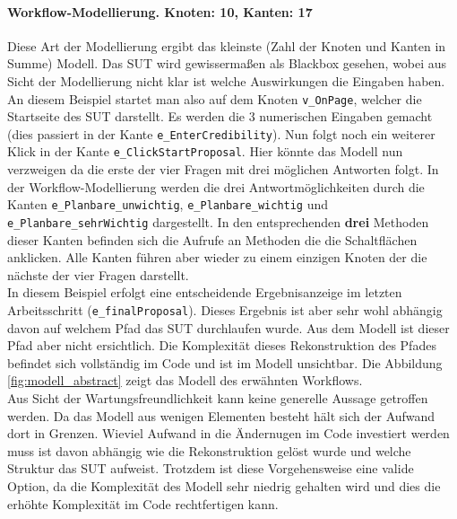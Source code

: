 \paragraph{Workflow-Modellierung. Knoten: 10, Kanten: 17}
Diese Art der Modellierung ergibt das kleinste (Zahl der Knoten und Kanten in Summe) Modell. Das SUT wird gewissermaßen als Blackbox gesehen, wobei aus Sicht der Modellierung nicht klar ist welche Auswirkungen die Eingaben haben. An diesem Beispiel startet man also auf dem Knoten \texttt{v\_OnPage}, welcher die Startseite des SUT darstellt. Es werden die 3 numerischen Eingaben gemacht (dies passiert in der Kante \texttt{e\_EnterCredibility}). Nun folgt noch ein weiterer Klick in der Kante \texttt{e\_ClickStartProposal}. Hier könnte das Modell nun verzweigen da die erste der vier Fragen mit drei möglichen Antworten folgt. In der Workflow-Modellierung werden die drei Antwortmöglichkeiten durch die Kanten \texttt{e\_Planbare\_unwichtig}, \texttt{e\_Planbare\_wichtig} und \texttt{e\_Planbare\_sehrWichtig} dargestellt. In den entsprechenden \textbf{drei} Methoden dieser Kanten befinden sich die Aufrufe an Methoden die die Schaltflächen anklicken. Alle Kanten führen aber wieder zu einem einzigen Knoten der die nächste der vier Fragen darstellt.\\
In diesem Beispiel erfolgt eine entscheidende Ergebnisanzeige im letzten Arbeitsschritt (\texttt{e\_finalProposal}). Dieses Ergebnis ist aber sehr wohl abhängig davon auf welchem Pfad das SUT durchlaufen wurde. Aus dem Modell ist dieser Pfad aber nicht ersichtlich. Die Komplexität dieses Rekonstruktion des Pfades befindet sich vollständig im Code und ist im Modell unsichtbar. Die Abbildung \ref{fig:modell_abstract} zeigt das Modell des erwähnten Workflows.\\
Aus Sicht der Wartungsfreundlichkeit kann keine generelle Aussage getroffen werden. Da das Modell aus wenigen Elementen besteht hält sich der Aufwand dort in Grenzen. Wieviel Aufwand in die Ändernugen im Code investiert werden muss ist davon abhängig wie die Rekonstruktion gelöst wurde und welche Struktur das SUT aufweist. Trotzdem ist diese Vorgehensweise eine valide Option, da die Komplexität des Modell sehr niedrig gehalten wird und dies die erhöhte Komplexität im Code rechtfertigen kann.

